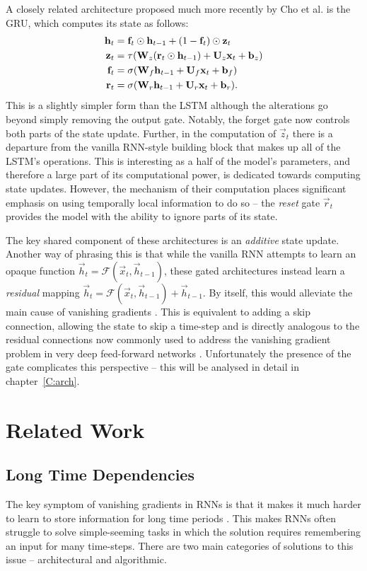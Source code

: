A closely related architecture proposed much more recently by Cho et al. \autocite{Cho2014} is the
GRU, which computes its state as follows:
\begin{align}\label{eq:GRU}
	\mathbf{h}_t &= \mathbf{f}_t \odot \mathbf{h}_{t-1} + (1 - \mathbf{f}_t)\odot\mathbf{z}_t\\
	\mathbf{z}_t &= \tau(\mathbf{W}_z(\mathbf{r}_t \odot \mathbf{h}_{t-1}) + \mathbf{U}_z\mathbf{x}_t + \mathbf{b}_z)\\
	\mathbf{f}_t &= \sigma(\mathbf{W}_f\mathbf{h}_{t-1} + \mathbf{U}_f\mathbf{x}_t + \mathbf{b}_f)\\
	\mathbf{r}_t &= \sigma(\mathbf{W}_r\mathbf{h}_{t-1} + \mathbf{U}_r\mathbf{x}_t + \mathbf{b}_r).
\end{align} This is a slightly simpler form than the LSTM although the alterations go beyond
simply removing the output gate. Notably, the forget gate now controls both parts of the state
update. Further, in the computation of \(\vec{z}_t\) there is a departure from the vanilla
RNN-style building block that makes up all of the LSTM's operations. This is interesting as a
half of the model's parameters, and therefore a large part of its computational power, is
dedicated towards computing state updates. However, the mechanism of their computation places
significant emphasis on using temporally local information to do so -- the \emph{reset} gate
\(\vec{r}_t\) provides the model with the ability to ignore parts of its state.

The key shared component of these architectures is an \emph{additive} state update. Another way
of phrasing this is that while the vanilla RNN attempts to learn an opaque function
\(\vec{h}_t = \mathcal{F}(\vec{x}_t, \vec{h}_{t-1})\), these gated architectures instead learn
a \emph{residual} mapping \(\vec{h}_t = \mathcal{F}(\vec{x}_t, \vec{h}_{t-1}) + \vec{h}_{t-1}\).
By itself, this would alleviate the main cause of vanishing gradients 
\autocite{Jozefowicz2015, Hochreiter1997}. This is equivalent to adding a skip connection,
allowing the state to skip a time-step and is directly analogous to the residual connections
now commonly used to address the vanishing gradient problem in very deep feed-forward networks
\autocite{He2015, Duvenaud2014, Szegedy2016}. Unfortunately the presence of the gate complicates
this perspective -- this will be analysed in detail in chapter~\ref{C:arch}.


\section{Related Work}
\subsection{Long Time Dependencies}
The key symptom of vanishing gradients in RNNs is that it makes it much harder to learn to
store information for long time periods \autocite{Bengio1994}. This makes RNNs often struggle to
solve simple-seeming tasks in which the solution requires remembering an input for many
time-steps. There are two main categories of solutions to this issue -- architectural and
algorithmic.

